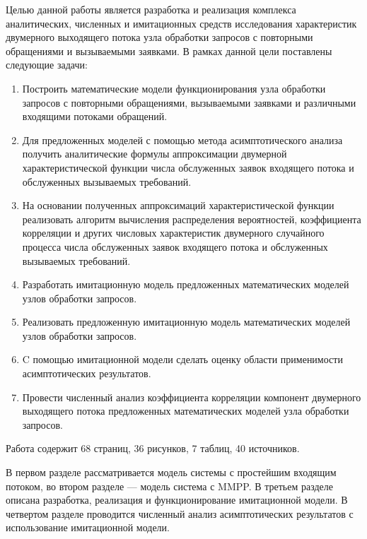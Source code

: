 Целью данной работы является разработка и реализация  комплекса аналитических, численных и имитационных средств исследования характеристик двумерного выходящего потока узла обработки запросов с повторными обращениями и вызываемыми заявками. В рамках данной цели поставлены следующие задачи:
\begin{enumerate}
	\item Построить математические модели функционирования узла обработки запросов с повторными обращениями, вызываемыми заявками и различными входящими потоками обращений.
	\item Для предложенных моделей с помощью метода асимптотического анализа получить аналитические формулы аппроксимации двумерной характеристической функции числа обслуженных заявок входящего потока и обслуженных вызываемых требований. 
	\item На основании полученных аппроксимаций характеристической функции реализовать алгоритм вычисления распределения вероятностей, коэффициента корреляции и других числовых характеристик двумерного случайного процесса числа обслуженных заявок входящего потока и обслуженных вызываемых требований.
	\item Разработать имитационную модель предложенных математических моделей узлов обработки запросов.
	\item Реализовать предложенную имитационную модель математических моделей узлов обработки запросов.
	\item C помощью имитационной модели сделать оценку области применимости асимптотических результатов.
	\item Провести численный анализ коэффициента корреляции компонент двумерного выходящего потока предложенных математических моделей узла обработки запросов.
\end{enumerate}

Работа содержит 68 страниц, 36 рисунков, 7 таблиц, 40 источников.

В первом разделе рассматривается модель системы с простейшим входящим потоком, во втором разделе --- модель система с MMPP. В третьем разделе описана разработка, реализация и функционирование имитационной модели. В четвертом разделе проводится численный анализ асимптотических результатов с использование имитационной модели.

 \clearpage